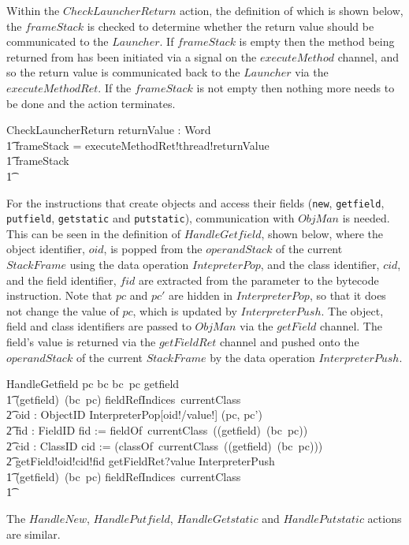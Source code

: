 Within the $CheckLauncherReturn$ action, the definition of which is
shown below, the $frameStack$ is checked to determine whether the
return value should be communicated to the $Launcher$.
If $frameStack$ is empty then the method being returned from has been
initiated via a signal on the $executeMethod$ channel, and so the
return value is communicated back to the $Launcher$ via the
$executeMethodRet$. 
If the $frameStack$ is not empty then nothing more needs to be done
and the action terminates.
\begin{circusaction}
  CheckLauncherReturn \circdef \circval returnValue : Word \circspot \\
  \t1 \circif frameStack = \emptyset \circthen executeMethodRet!thread!returnValue \then \Skip \\
  \t1 {} \circelse frameStack \neq \emptyset \circthen \Skip \\
  \t1 \circfi
\end{circusaction}

For the instructions that create objects and access their fields
(\texttt{new}, \texttt{getfield}, \texttt{putfield},
\texttt{getstatic} and \texttt{putstatic}), communication with
$ObjMan$ is needed.
This can be seen in the definition of $HandleGetfield$, shown below,
where the object identifier, $oid$, is popped from the $operandStack$
of the current $StackFrame$ using the data operation $IntepreterPop$,
and the class identifier, $cid$, and the field identifier, $fid$ are
extracted from the parameter to the bytecode instruction.
Note that $pc$ and $pc'$ are hidden in $InterpreterPop$, so that it
does not change the value of $pc$, which is updated by
$InterpreterPush$. 
The object, field and class identifiers are passed to $ObjMan$ via the
$getField$ channel.
The field's value is returned via the $getFieldRet$ channel and pushed
onto the $operandStack$ of the current $StackFrame$ by the data
operation $InterpreterPush$.
\begin{circusaction}
  HandleGetfield \circdef \lcircguard pc \in \dom bc \land bc~pc \in \ran getfield \rcircguard \circguard \\
  \t1 \circif (getfield\inv)~(bc~pc) \in fieldRefIndices~currentClass \circthen {} \\
  \t2 \circvar oid : ObjectID \circspot \lschexpract InterpreterPop[oid!/value!] \hide (pc, pc') \rschexpract \circseq \\
  \t2 \circvar fid : FieldID \circspot fid := fieldOf~currentClass~((getfield\inv)~(bc~pc)) \circseq \\
  \t2 \circvar cid : ClassID \circspot cid := (classOf~currentClass~((getfield\inv)~(bc~pc))) \circseq \\
  \t2 getField!oid!cid!fid \then getFieldRet?value \then \lschexpract InterpreterPush \rschexpract \\
  \t1 {} \circelse (getfield\inv)~(bc~pc) \notin fieldRefIndices~currentClass \circthen \Chaos \\
  \t1 \circfi
\end{circusaction}
The $HandleNew$, $HandlePutfield$, $HandleGetstatic$ and
$HandlePutstatic$ actions are similar.

